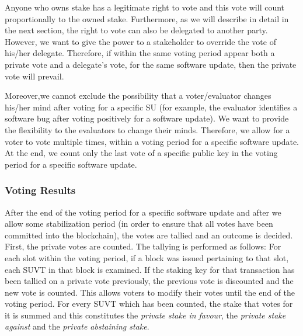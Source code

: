 Anyone who owns stake has a legitimate right to vote and this vote will count proportionally to the owned stake. Furthermore, as we will describe in detail in the next section, the right to vote can also be delegated to another party. However, we want to give the power to a stakeholder to override the vote of his/her delegate. Therefore, if within the same voting period appear both a private vote and a delegate's vote, for the same software update, then the private vote will prevail.

Moreover,we cannot exclude the possibility that a voter/evaluator changes his/her mind after voting for a specific SU (for example, the evaluator identifies a software bug after voting positively for a software update). We want to provide the flexibility to the evaluators to change their minds. Therefore, we allow for a voter to vote multiple times, within a voting period for a specific software update. At the end, we count only the last vote of a specific public key in the voting period for a specific software update.

\subsubsection{Voting Results}
After the end of the voting period for a specific software update and after we allow some stabilization period (in order to ensure that all votes have been committed into the blockchain), the votes are tallied and an outcome is decided. First, the private votes are counted. The tallying is performed as follows: For each slot within the voting period, if a block was issued pertaining to that slot, each SUVT in that block is examined. If the staking key for that transaction has been tallied on a private vote previously, the previous vote is discounted and the new vote is counted. This allows voters to modify their votes until the end of the voting period. For every SUVT which has been counted, the stake that votes for it is summed and this constitutes the \emph{private stake in favour}, the \emph{private stake against} and the \emph{private abstaining stake}. 

